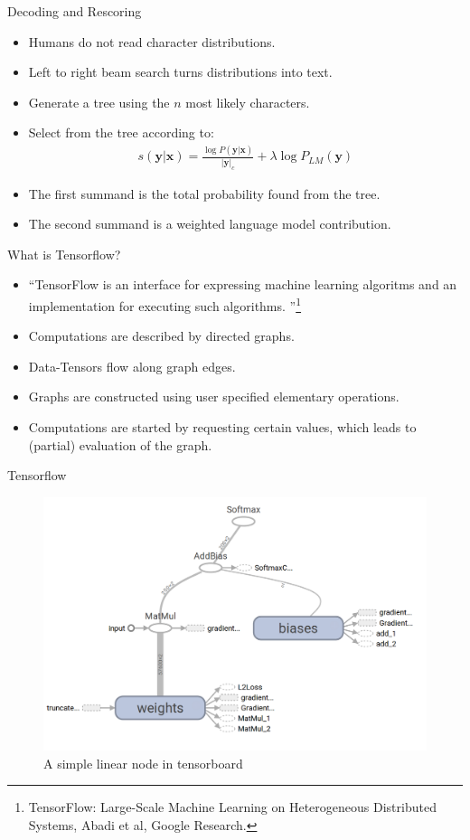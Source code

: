 \documentclass{beamer}
\begin{document}
\begin{frame}{Decoding and Rescoring}
\begin{itemize}
	\item Humans do not read character distributions.
	\item Left to right beam search turns distributions into text.
	\item Generate a tree using the $n$ most likely characters.
	\item Select from the tree according to:
		\begin{align}
		s(\mathbf{y}|\mathbf{x}) = \frac{\log P(\mathbf{y}|\mathbf{x})}{ |\mathbf{y}|_c} + \lambda \log P_{LM}(\mathbf{y})
		\end{align}
	\item The first summand is the total probability found from the tree. 
	\item The second summand is a weighted language model contribution.
\end{itemize}
\end{frame}



\begin{frame}{What is Tensorflow?}
	\begin{itemize}
		\item \textquotedblleft TensorFlow is an interface for expressing machine learning algoritms and an implementation for executing such algorithms. \textquotedblright \footnote{TensorFlow:
			  Large-Scale Machine Learning on Heterogeneous Distributed Systems, Abadi et al, Google Research.}
		\item Computations are described by directed graphs. 
		\item Data-Tensors flow along graph edges.
		\item Graphs are constructed using user specified elementary
			  operations.
		\item Computations are started by requesting certain values, which leads
			  to (partial) evaluation of the graph.
	\end{itemize}
\end{frame}


\begin{frame}{Tensorflow}
\begin{figure}
\centering
\includegraphics[width=0.7\linewidth]{../png/net1}
\caption{A simple linear node in tensorboard}
\label{fig:net1}
\end{figure}
\end{frame}
\end{document}
